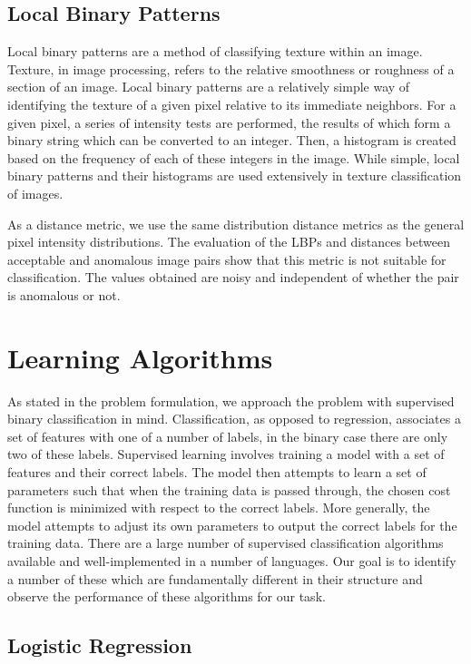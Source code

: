 \subsection{Local Binary Patterns}

Local binary patterns are a method of classifying texture within an image.
Texture, in image processing, refers to the relative smoothness or roughness of a section of an image.
Local binary patterns are a relatively simple way of identifying the texture of a given pixel relative to its immediate neighbors.
For a given pixel, a series of intensity tests are performed, the results of which form a binary string which can be converted to an integer.
Then, a histogram is created based on the frequency of each of these integers in the image.
While simple, local binary patterns and their histograms are used extensively in texture classification of images.

As a distance metric, we use the same distribution distance metrics as the general pixel intensity distributions.
The evaluation of the LBPs and distances between acceptable and anomalous image pairs show that this metric is not suitable for classification.
The values obtained are noisy and independent of whether the pair is anomalous or not.


\section{Learning Algorithms}

As stated in the problem formulation, we approach the problem with supervised binary classification in mind.
Classification, as opposed to regression, associates a set of features with one of a number of labels, in the binary case there are only two of these labels.
Supervised learning involves training a model with a set of features and their correct labels.
The model then attempts to learn a set of parameters such that when the training data is passed through, the chosen cost function is minimized with respect to the correct labels.
More generally, the model attempts to adjust its own parameters to output the correct labels for the training data.
There are a large number of supervised classification algorithms available and well-implemented in a number of languages.
Our goal is to identify a number of these which are fundamentally different in their structure and observe the performance of these algorithms for our task.


\subsection{Logistic Regression}

